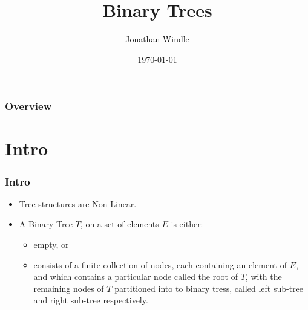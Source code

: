 \documentclass{beamer}
\title[Binary Trees]{Binary Trees} %
\author{Jonathan Windle} %
\institute[UEA] %
{
University of East Anglia \\ %
\medskip
\textit{J.Windle@uea.ac.uk} %
}
\date{\today} %
\begin{document}
\begin{frame}
\titlepage %
\end{frame}

\begin{frame}[allowframebreaks]
\frametitle{Overview} %
\tableofcontents %
\end{frame}

\section{Intro}
\begin{frame}
\frametitle{Intro}
\begin{itemize}
\item Tree structures are {\color{green}Non-Linear}.
\item A {\color{red} Binary Tree} $T$, on a set of elements $E$ is either:
\begin{itemize}
\item empty, or
\item consists of a finite collection of nodes, each containing an element of $E$, and which contains a particular node called the {\color{purple} root} of $T$, with the remaining nodes of $T$ partitioned into to binary tress, called {\color{orange} left sub-tree} and {\color{magenta} right sub-tree} respectively.
\end{itemize}
\end{itemize}
\end{frame}
\end{document}
